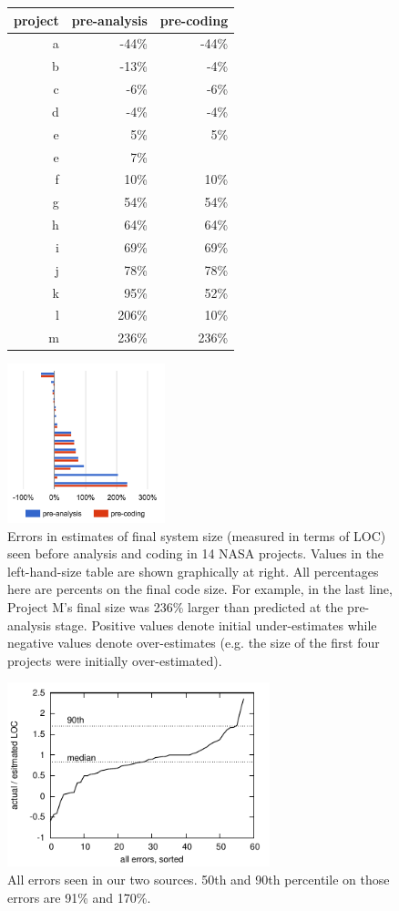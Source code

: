 \documentclass[final,twocolumn]{elsarticle}
\theoremstyle{break}
\begin{document}
 \begin{figure}
      \scriptsize
      \begin{minipage}{.5\linewidth}
      \begin{tabular}{r|rr|}
   project & pre-analysis&pre-coding\\\hline
a&-44\%&-44\%\\
b&-13\%&-4\%\\
c&-6\%&-6\%\\
d&-4\%&-4\%\\
e&5\%&5\%\\
e&7\%&\\
f&10\%&10\%\\
g&54\%&54\%\\
h&64\%&64\%\\
i&69\%&69\%\\
j&78\%&78\%\\
k&95\%&52\%\\
l&206\%&10\%\\
m&236\%&236\%
      \end{tabular}\end{minipage} \begin{minipage}{.33\linewidth}
        \includegraphics[width=1.8in]{nasadata.png}
        \end{minipage}
      \caption{Errors in estimates of final system size (measured in terms of LOC)
        seen before analysis and coding in 14 NASA projects. Values in the left-hand-size table
        are shown graphically at right.
        All percentages here are percents on the final code size. For example, in the last
        line, Project M's final size was 236\% larger than predicted at the pre-analysis stage.
        Positive values denote initial under-estimates while negative values denote over-estimates
        (e.g. the size of the first four projects were initially over-estimated).}
        \label{fig:nasaloc}
    \end{figure}


 
\begin{figure}
\includegraphics[width=3in]{all.pdf}
\caption{All errors seen in our two sources. 50th and 90th percentile on those errors are 91\% and 170\%.}\label{fig:allerr}
\end{figure}
\end{document}
